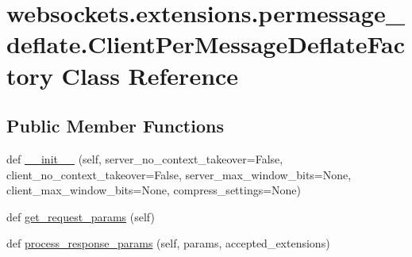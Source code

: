 \hypertarget{classwebsockets_1_1extensions_1_1permessage__deflate_1_1_client_per_message_deflate_factory}{}\section{websockets.\+extensions.\+permessage\+\_\+deflate.\+Client\+Per\+Message\+Deflate\+Factory Class Reference}
\label{classwebsockets_1_1extensions_1_1permessage__deflate_1_1_client_per_message_deflate_factory}
\subsection*{Public Member Functions}
\begin{DoxyCompactItemize}
\item 
def \hyperlink{classwebsockets_1_1extensions_1_1permessage__deflate_1_1_client_per_message_deflate_factory_acccda4b2223492f61411ad77ef269a5a}{\+\_\+\+\_\+init\+\_\+\+\_\+} (self, server\+\_\+no\+\_\+context\+\_\+takeover=False, client\+\_\+no\+\_\+context\+\_\+takeover=False, server\+\_\+max\+\_\+window\+\_\+bits=None, client\+\_\+max\+\_\+window\+\_\+bits=None, compress\+\_\+settings=None)
\item 
def \hyperlink{classwebsockets_1_1extensions_1_1permessage__deflate_1_1_client_per_message_deflate_factory_ad4e72044f0b5f5850b916cf290a8cea6}{get\+\_\+request\+\_\+params} (self)
\item 
def \hyperlink{classwebsockets_1_1extensions_1_1permessage__deflate_1_1_client_per_message_deflate_factory_abfb6bb71dfb7be83ae1f6396bd8c05b5}{process\+\_\+response\+\_\+params} (self, params, accepted\+\_\+extensions)
\end{DoxyCompactItemize}
